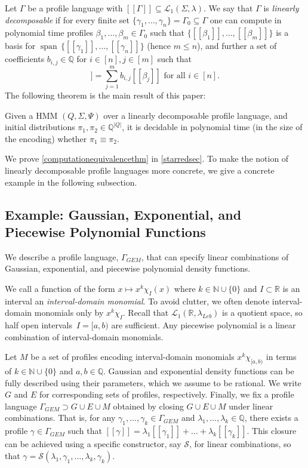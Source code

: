 \documentclass[a4paper,UKenglish,cleveref, autoref,mathscr]{lipics-v2019}
\newcommand{\RR}{\mathbb{R}}
\newcommand{\NN}{\mathbb{N}}
\newcommand{\QQ}{\mathbb{Q}}
\newcommand{\1}{\mathbbm{1}}
\newcommand{\pl}{\Gamma_{\mathit{GEM}}}
\newcommand{\Leb}{\lambda_{\mathit{Leb}}}
\DeclareMathOperator{\Span}{span\,}
\begin{document}
Let $\Gamma$ be a profile language with $[\![\Gamma]\!] \subseteq \mathcal{L}_1(\Sigma, \lambda)$. We say that $\Gamma$ is \emph{linearly decomposable} if for every finite set $\{\gamma_1, \dots, \gamma_n\} = \Gamma_0 \subseteq \Gamma$ one can compute in polynomial time profiles $\beta_1, \dots, \beta_m \in \Gamma_0$ such that $\{[\![\beta_1]\!], \dots, [\![\beta_m]\!]\}$ is a basis for $\Span \{[\![\gamma_1]\!], \dots, [\![\gamma_n]\!]\}$ (hence $m \leq n$), and further a set of coefficients $b_{i,j} \in \QQ$ for $i \in [n], j \in [m]$ such that
\begin{equation*}
[\![\gamma_i]\!] = \sum_{j = 1}^m b_{i,j}[\![\beta_j]\!] \text{ for all $i \in [n]$.}
\end{equation*}
The following theorem is the main result of this paper:
\begin{theorem}\label{computationequivalencethm}
Given a HMM $(Q, \Sigma, \Psi)$ over a linearly decomposable profile language, and initial distributions $\pi_1, \pi_2 \in \QQ^{|Q|}$, it is decidable in polynomial time (in the size of the encoding) whether $\pi_1 \equiv \pi_2$.
\end{theorem}
We prove \cref{computationequivalencethm} in \cref{starredsec}.
To make the notion of linearly decomposable profile languages more concrete, we give a concrete example in the following subsection.

\subsection{Example: Gaussian, Exponential, and Piecewise Polynomial Functions} \label{sub-profile-example}

We describe a profile language, $\pl$, that can specify linear combinations of Gaussian, exponential, and piecewise polynomial density functions.

We call a function of the form $x \mapsto x^k \chi_{I}(x)$ where $k \in \NN \cup \{0\}$ and $I \subset \RR$ is an interval an \emph{interval-domain monomial}.
To avoid clutter, we often denote interval-domain monomials only by $x^k \chi_I$.
Recall that $\mathcal{L}_1(\RR, \Leb)$ is a quotient space, so half open intervals~$I = [a,b)$ are sufficient. Any piecewise polynomial is a linear combination of interval-domain monomials.

Let $M$ be a set of profiles encoding interval-domain monomials $x^k \chi_{[a,b)}$ in terms of $k \in \NN \cup \{0\}$ and $a,b \in \QQ$. Gaussian and exponential density functions can be fully described using their parameters, which we assume to be rational. We write $G$ and $E$ for corresponding sets of profiles, respectively.
%
Finally, we fix a profile language $\pl \supset G \cup E \cup M$ obtained by closing $G \cup E \cup M$ under linear combinations. That is, for any $\gamma_1, \dots, \gamma_k \in \pl$ and $\lambda_1, \dots, \lambda_k \in \QQ$, there exists a profile $\gamma \in \pl$ such that $[\![\gamma]\!] = \lambda_1 [\![\gamma_1]\!] + \dots + \lambda_k [\![\gamma_k]\!]$.
This closure can be achieved using a specific constructor, say $\mathcal{S}$, for linear combinations, so that $\gamma = \mathcal{S}(\lambda_1, \gamma_1, \ldots, \lambda_k, \gamma_k)$.
\end{document}
